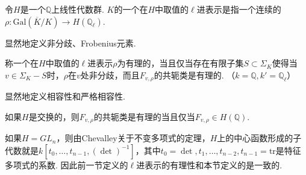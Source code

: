 \begin{cdef}
    令$H$是一个$\mathbb{Q}$上线性代数群. $K$的一个在$H$中取值的$\ell$进表示是指一个连续的$\rho: \mathrm{Gal}(\overline{K}/K)\to H(\mathbb{Q}_{\ell})$.
\end{cdef}

显然地定义非分歧、Frobenius元素.

\begin{cdef}
    称一个在$H$中取值的$\ell$进表示$\rho$为有理的，当且仅当存在有限子集$S\subset \Sigma_K$使得当$v\in \Sigma_K - S$时，$\rho$在$v$处非分歧，而且$F_{v, \rho}$的共轭类是有理的. （$k=\mathbb{Q}, k'=\mathbb{Q}_{\ell}$）
\end{cdef}

显然地定义相容性和严格相容性.

\begin{crem}
    如果$H$是交换的，则$F_{v,\rho}$的共轭类是有理的当且仅当$F_{v,\rho} \in H(\mathbb{Q})$.
\end{crem}

\begin{crem}
    如果$H = GL_n$，则由Chevalley关于不变多项式的定理，$H$上的中心函数形成的子代数就是$k[t_0,\ldots,t_{n-1}, (\det)^{-1}]$，其中$t_0=\det,t_1,\ldots,t_{n-2},t_{n-1}=\mathrm{tr}$是特征多项式的系数. 因此前一节定义的$\ell$进表示的有理性和本节定义的是一致的.
\end{crem}
